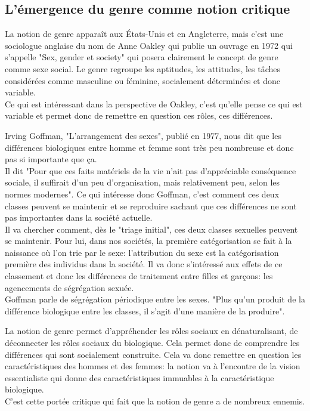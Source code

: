 \documentclass[10pt, a4paper, openany]{book}
\begin{document}
\subsection{L'émergence du genre comme notion critique}

La notion de genre apparaît aux États-Unis et en Angleterre, mais c'est une sociologue anglaise du nom de Anne Oakley qui publie un ouvrage en 1972 qui s'appelle "Sex, gender et society" qui posera clairement le concept de genre comme sexe social. Le genre regroupe les aptitudes, les attitudes, les tâches considérées comme masculine ou féminine, socialement déterminées et donc variable. \\
Ce qui est intéressant dans la perspective de Oakley, c'est qu'elle pense ce qui est variable et permet donc de remettre en question ces rôles, ces différences. 


Irving Goffman, "L'arrangement des sexes", publié en 1977, nous dit que les différences biologiques entre homme et femme sont très peu nombreuse et donc pas si importante que ça. \\ 
Il dit "Pour que ces faits matériels de la vie n'ait pas d'appréciable conséquence sociale, il suffirait d'un peu d'organisation, mais relativement peu, selon les normes modernes". Ce qui intéresse donc Goffman, c'est comment ces deux classes peuvent se maintenir et se reproduire sachant que ces différences ne sont pas importantes dans la société actuelle. \\
Il va chercher comment, dès le "triage initial", ces deux classes sexuelles peuvent se maintenir. Pour lui, dans nos sociétés, la première catégorisation se fait à la naissance où l'on trie par le sexe: l'attribution du sexe est la catégorisation première des individus dans la société. Il va donc s'intéressé aux effets de ce classement et donc les différences de traitement entre filles et garçons: les agencements de ségrégation sexuée. \\ 
Goffman parle de ségrégation périodique entre les sexes. "Plus qu'un produit de la différence biologique entre les classes, il s'agit d'une manière de la produire". 


La notion de genre permet d'appréhender les rôles sociaux en dénaturalisant, de déconnecter les rôles sociaux du biologique. Cela permet donc de comprendre les différences qui sont socialement construite. Cela va donc remettre en question les caractéristiques des hommes et des femmes: la notion va à l'encontre de la vision essentialiste qui donne des caractéristiques immuables à la caractéristique biologique. \\
C'est cette portée critique qui fait que la notion de genre a de nombreux ennemis. 
\end{document}
